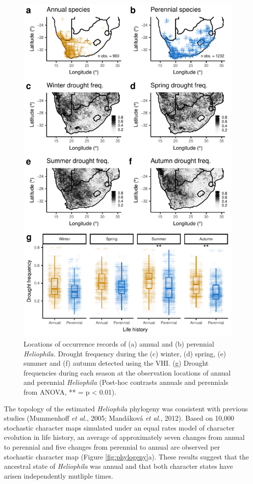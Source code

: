 \documentclass[man,floatsintext]{apa6}
\theoremstyle{definition}
\theoremstyle{definition}
\theoremstyle{definition}
\theoremstyle{remark}
\begin{document}
\begin{figure}[!h]
\includegraphics[width=\textwidth]{../figures/maps_boxplots} \caption{Locations of occurrence records of (a) annual and (b)
perennial \emph{Heliophila.} Drought frequency during the (c) winter,
(d) spring, (e) summer and (f) autumn detected using the VHI. (g)
Drought frequencies during each season at the observation locations of
annual and perennial \emph{Heliophila} (Post-hoc contrasts annuals and
perennials from ANOVA, ** = p \textless{} 0.01).}\label{fig:mapsboxplots}
\end{figure}

The topology of the estimated \emph{Heliophila} phylogeny was consistent
with previous studies (Mummenhoff \emph{et al.}, 2005; Mandáková
\emph{et al.}, 2012). Based on 10,000 stochastic character maps
simulated under an equal rates model of character evolution in life
history, an average of approximately seven changes from annual to
perennial and five changes from perennial to annual are observed per
stochastic character map (Figure \ref{fig:phylogeny}a). These results
suggest that the ancestral state of \emph{Heliophila} was annual and
that both character states have arisen independently mutliple times.
\end{document}
